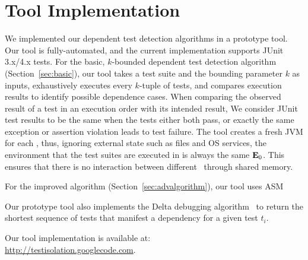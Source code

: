 \section{Tool Implementation}
\label{sec:impl}


We implemented our dependent test detection algorithms in
a prototype tool. Our tool is fully-automated, and the
current implementation supports JUnit 3.x/4.x tests.
For the basic, $k$-bounded dependent test detection algorithm
(Section~\ref{sec:basic}), our tool takes a test suite
and the bounding parameter $k$ as inputs, 
exhaustively executes every $k$-tuple
of tests, and compares execution results to identify possible dependence cases. When
comparing the observed result of a test in an execution order with
its intended result,
We consider JUnit test results to be the same when the tests either
both pass, or exactly the same exception or assertion violation leads
to test failure.
The tool creates a fresh JVM for each \testlist, thus, ignoring
external state such as files and OS services, the environment
that the test suites are executed in is always the same $\mathbf{E}_0$.
This ensures that there is no interaction between
different \testlist\ through shared memory.

For the improved algorithm (Section~\ref{sec:advalgorithm}),
our tool uses ASM 


Our prototype tool also implements the Delta debugging algorithm~\cite{Zeller:2002}
to return the shortest sequence of tests that manifest a dependency
for a given test $t_i$.

Our tool implementation is available at: \\\url{http://testisolation.googlecode.com}.








